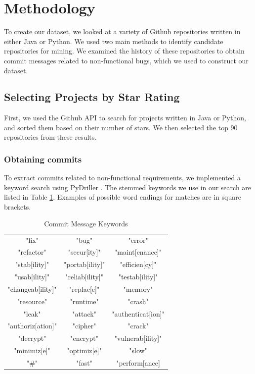 \documentclass[sigconf]{acmart}
\begin{document}
\section{Methodology}
To create our dataset, we looked at a variety of Github repositories written in either Java or Python. 
We used two main methods to identify candidate repositories for mining. We examined the history of these repositories to obtain commit messages related to non-functional bugs, which we used to construct our dataset.
 
\subsection{Selecting Projects by Star Rating}
First, we used the Github API to search for projects written in Java or Python, and sorted them based on their number of stars. We then selected the top 90 repositories from these results. 

\subsubsection{Obtaining commits}
To extract commits related to non-functional requirements, we implemented a keyword search using PyDriller \cite{Spadini2018}. The stemmed keywords we use in our search are listed in Table \ref{tab:kwds}. Examples of possible word endings for matches are in square brackets.

\begin{table}
  \caption{Commit Message Keywords}
  \label{tab:kwds}
\begin{tabular}{ c c c }
  \toprule
   "fix"             &"bug"           &"error"\\
   "refactor"		 &"secur[ity]"    &"maint[enance]"\\
   "stab[ility]"	 &"portab[ility]" &"efficien[cy]"\\
   "usab[ility]" 	 &"reliab[ility]" &"testab[ility]"\\
   "changeab[ility]" &"replac[e]"     &"memory"\\
   "resource"        &"runtime"       &"crash"\\
   "leak"            &"attack"        &"authenticat[ion]"\\
   "authoriz[ation]" &"cipher"        &"crack" \\ 
   "decrypt"         &"encrypt"       &"vulnerab[ility]"\\ 
   "minimiz[e]"      &"optimiz[e]"    &"slow"\\
   "\#"              &"fast"          &"perform[ance]\\
  \bottomrule
\end{tabular}
\end{table}
\end{document}
